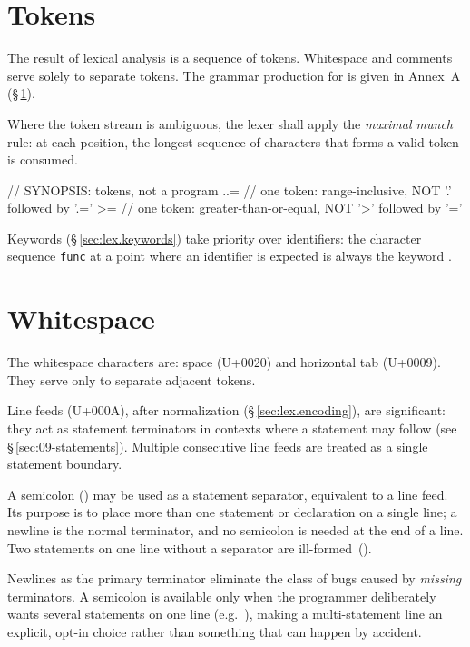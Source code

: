 \section{Tokens}
\label{sec:lex.tokens}

\pnum
The result of lexical analysis is a sequence of tokens.  Whitespace and
comments serve solely to separate tokens.  The grammar production for
 is given in Annex~A (\S\,\ref{sec:lex.tokens}).

\pnum
Where the token stream is ambiguous, the lexer shall apply the
\textit{maximal munch} rule: at each position, the longest sequence of
characters that forms a valid token is consumed.

\begin{example}
\begin{laincode}
// SYNOPSIS: tokens, not a program
..=    // one token: range-inclusive, NOT '.' followed by '.='
>=     // one token: greater-than-or-equal, NOT '>' followed by '='
\end{laincode}
\end{example}

\pnum
Keywords (\S\,\ref{sec:lex.keywords}) take priority over identifiers: the
character sequence \texttt{func} at a point where an identifier is expected
is always the keyword .

\section{Whitespace}
\label{sec:lex.whitespace}

\pnum
The whitespace characters are: space (U+0020) and horizontal tab (U+0009).
They serve only to separate adjacent tokens.

\pnum
Line feeds (U+000A), after normalization (\S\,\ref{sec:lex.encoding}), are
significant: they act as statement terminators in contexts where a statement
may follow (see \S\,\ref{sec:09-statements}).  Multiple consecutive line
feeds are treated as a single statement boundary.

\pnum
A semicolon (\tok{;}) may be used as a statement separator, equivalent to a
line feed.  Its purpose is to place more than one statement or declaration on a
single line; a newline is the normal terminator, and no semicolon is needed at
the end of a line.  Two statements on one line without a separator are
ill-formed~().

\begin{rationale}
  Newlines as the primary terminator eliminate the class of bugs caused by
  \emph{missing} terminators.  A semicolon is available only when the programmer
  deliberately wants several statements on one line (e.g.\ ),
  making a multi-statement line an explicit, opt-in choice rather than something
  that can happen by accident.
\end{rationale}

